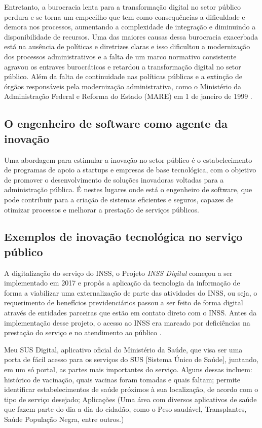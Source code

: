 \documentclass[12pt,oneside,a4paper,article]{abntex2}
\begin{document}
Entretanto, a burocracia lenta para a transformação digital no setor público perdura e se torna um empecilho que tem como consequências a dificuldade e demora nos processos, aumentando a complexidade de integração e diminuindo a disponibilidade de recursos. Uma das maiores causas dessa burocracia exacerbada está na ausência de políticas e diretrizes claras e isso dificultou a modernização dos processos administrativos e a falta de um marco normativo consistente agravou os entraves burocráticos e retardou a transformação digital no setor público. Além da falta de continuidade nas políticas públicas e a extinção de órgãos responsáveis pela modernização administrativa, como o Ministério da Administração Federal e Reforma do Estado (MARE) em 1 de janeiro de 1999 \cite{grin2015programa}.

\subsection{O engenheiro de software como agente da inovação}

Uma abordagem para estimular a inovação no setor público é o estabelecimento de programas de apoio a startups e empresas de base tecnológica, com o objetivo de promover o desenvolvimento de soluções inovadoras voltadas para a administração pública. É nestes lugares onde está o engenheiro de software, que pode contribuir para a criação de sistemas eficientes e seguros, capazes de otimizar processos e melhorar a prestação de serviços públicos. 

\subsection{Exemplos de inovação tecnológica no serviço público}

A digitalização do serviço do INSS, o Projeto \textit{INSS Digital} começou a ser implementado em 2017 e propôs a aplicação da tecnologia da informação de forma a viabilizar uma externalização de parte das atividades do INSS, ou seja, o requerimento de benefícios previdenciários passou a ser feito de forma digital através de entidades parceiras que estão em contato direto com o INSS. Antes da implementação desse projeto, o acesso ao INSS era marcado por deficiências na prestação do serviço e no atendimento ao público \cite{pinheiro2021transformaccao}.

Meu SUS Digital, aplicativo oficial do Ministério da Saúde, que visa ser uma porta de fácil acesso para os serviços do SUS [Sistema Único de Saúde], juntando, em um só portal, as partes mais importantes do serviço. Alguns dessas incluem: histórico de vacinação, quais vacinas foram tomadas e quais faltam; permite identificar estabelecimentos de saúde próximos à sua localização, de acordo com o tipo de serviço desejado; Aplicações (Uma área com diversos aplicativos de saúde que fazem parte do dia a dia do cidadão, como o Peso saudável, Transplantes, Saúde População Negra, entre outros.) \cite{meususdigital}
\end{document}
